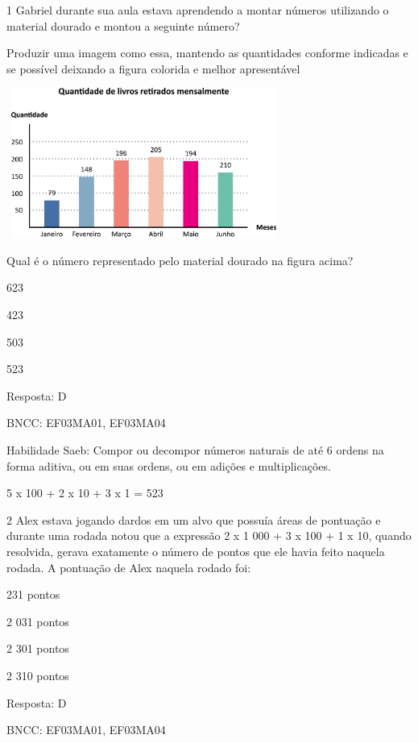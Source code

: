\begin{escolha}
\begin{escolha}
\num{1} Gabriel durante sua aula estava aprendendo a montar números utilizando o
material dourado e montou a seguinte número?

Produzir uma imagem como essa, mantendo as quantidades conforme
indicadas e se possível deixando a figura colorida e melhor apresentável

\includegraphics[width=3.55128in,height=1.93600in]{media/image106.png}

Qual é o número representado pelo material dourado na figura acima?

\begin{escolha}
\item
  623
\item
  423
\item
  503
\item
  523
\end{escolha}

Resposta: D

BNCC: EF03MA01, EF03MA04

Habilidade Saeb: Compor ou decompor números naturais de até 6 ordens na
forma aditiva, ou em suas ordens, ou em adições e multiplicações.

5 x 100 + 2 x 10 + 3 x 1 = 523

\num{2} Alex estava jogando dardos em um alvo que possuía áreas de pontuação e
durante uma rodada notou que a expressão 2 x 1 000 + 3 x 100 + 1 x 10,
quando resolvida, gerava exatamente o número de pontos que ele havia
feito naquela rodada. A pontuação de Alex naquela rodado foi:

\begin{escolha}
\item
  231 pontos
\item
  2 031 pontos
\item
  2 301 pontos
\item
  2 310 pontos
\end{escolha}

Resposta: D

BNCC: EF03MA01, EF03MA04


\end{escolha}
\end{escolha}
